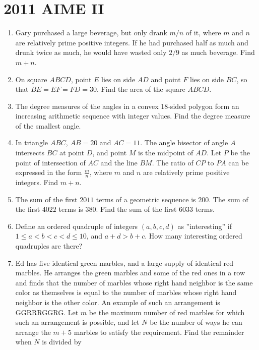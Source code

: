 \documentclass{article}
\begin{document}
\begin{enumerate}[label=\arabic*., itemsep=0.5em]
\vspace{0.5em}\end{enumerate}\newpage\section*{2011 AIME II}\begin{enumerate}[label=\arabic*., itemsep=0.5em]\item Gary purchased a large beverage, but only drank $m/n$ of it, where $m$ and $n$ are relatively prime positive integers. If he had purchased half as much and drunk twice as much, he would have wasted only $2/9$ as much beverage. Find $m+n$.\par \vspace{0.5em}\item On square $ABCD$, point $E$ lies on side $AD$ and point $F$ lies on side $BC$, so that $BE=EF=FD=30$. Find the area of the square $ABCD$.\par \vspace{0.5em}\item The degree measures of the angles in a convex 18-sided polygon form an increasing arithmetic sequence with integer values. Find the degree measure of the smallest angle.\par \vspace{0.5em}\item In triangle $ABC$, $AB=20$ and $AC=11$. The angle bisector of angle $A$ intersects $BC$ at point $D$, and point $M$ is the midpoint of $AD$. Let $P$ be the point of intersection of $AC$ and the line $BM$. The ratio of $CP$ to $PA$ can be expressed in the form $\frac{m}{n}$, where $m$ and $n$ are relatively prime positive integers. Find $m+n$.\par \vspace{0.5em}\item The sum of the first $2011$ terms of a geometric sequence is $200$. The sum of the first $4022$ terms is $380$. Find the sum of the first $6033$ terms.\par \vspace{0.5em}\item Define an ordered quadruple of integers $(a, b, c, d)$ as ''interesting'' if $1 \le a<b<c<d \le 10$, and $ a+d>b+c $. How many interesting ordered quadruples are there?\par \vspace{0.5em}\item Ed has five identical green marbles, and a large supply of identical red marbles. He arranges the green marbles and some of the red ones in a row and finds that the number of marbles whose right hand neighbor is the same color as themselves is equal to the number of marbles whose right hand neighbor is the other color. An example of such an arrangement is GGRRRGGRG. Let $m$ be the maximum number of red marbles for which such an arrangement is possible, and let $N$ be the number of ways he can arrange the $m+5$ marbles to satisfy the requirement. Find the remainder when $N$ is divided by 
\end{enumerate}
\end{document}
